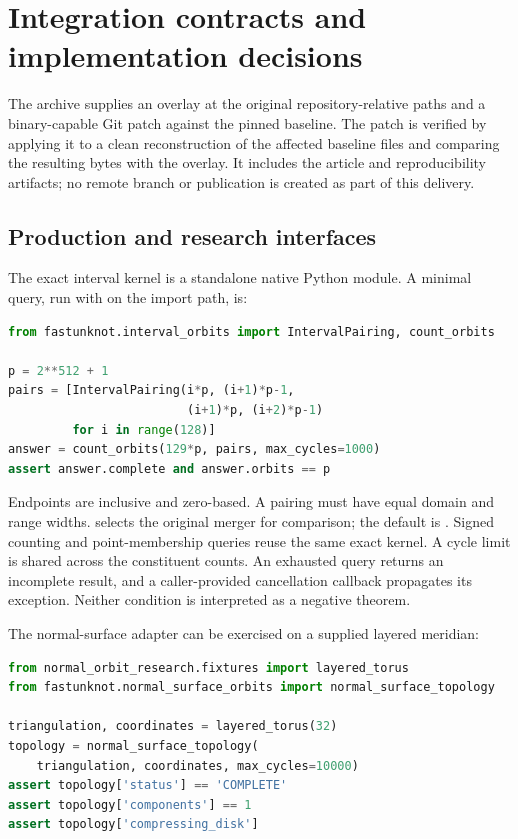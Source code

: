 \section{Integration contracts and implementation decisions}
\label{sec:integration}

The archive supplies an overlay at the original repository-relative paths
and a binary-capable Git patch against the pinned baseline. The patch is
verified by applying it to a clean reconstruction of the affected baseline
files and comparing the resulting bytes with the overlay. It includes the
article and reproducibility artifacts; no remote branch or publication is
created as part of this delivery.

\subsection{Production and research interfaces}

The exact interval kernel is a standalone native Python module. A minimal
query, run with  on the import path, is:

\noindent\begin{minipage}{\linewidth}
\begin{lstlisting}[language=Python]
from fastunknot.interval_orbits import IntervalPairing, count_orbits

p = 2**512 + 1
pairs = [IntervalPairing(i*p, (i+1)*p-1,
                         (i+1)*p, (i+2)*p-1)
         for i in range(128)]
answer = count_orbits(129*p, pairs, max_cycles=1000)
assert answer.complete and answer.orbits == p
\end{lstlisting}
\end{minipage}

Endpoints are inclusive and zero-based. A pairing must have equal domain
and range widths.  selects the original merger
for comparison; the default is . Signed counting and
point-membership queries reuse the same exact kernel. A cycle limit is
shared across the constituent counts. An exhausted query returns an
incomplete result, and a caller-provided cancellation callback propagates
its exception. Neither condition is interpreted as a negative theorem.

The normal-surface adapter can be exercised on a supplied layered meridian:

\noindent\begin{minipage}{\linewidth}
\begin{lstlisting}[language=Python]
from normal_orbit_research.fixtures import layered_torus
from fastunknot.normal_surface_orbits import normal_surface_topology

triangulation, coordinates = layered_torus(32)
topology = normal_surface_topology(
    triangulation, coordinates, max_cycles=10000)
assert topology['status'] == 'COMPLETE'
assert topology['components'] == 1
assert topology['compressing_disk']
\end{lstlisting}
\end{minipage}

